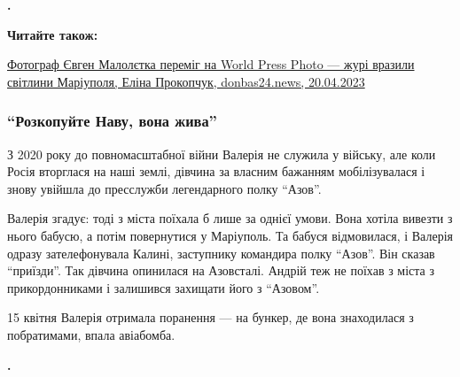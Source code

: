 \begin{leftbar}
	\begingroup
		\bfseries
{}.
	\endgroup
\end{leftbar}


\textbf{Читайте також:} 

\href{https://donbas24.news/news/fotograf-jevgen-maloljetka-peremig-na-world-press-photo-zuri-vrazili-svitlini-mariupolya}{%
Фотограф Євген Малолєтка переміг на World Press Photo — журі вразили світлини Маріуполя, %
Еліна Прокопчук, donbas24.news, 20.04.2023%
}

\subsubsection{\enquote{Розкопуйте Наву, вона жива}}

З 2020 року до повномасштабної війни Валерія не служила у війську, але коли
Росія вторглася на наші землі, дівчина за власним бажанням мобілізувалася і
знову увійшла до пресслужби легендарного полку \enquote{Азов}.

Валерія згадує: тоді з міста поїхала б лише за однієї умови. Вона хотіла
вивезти з нього бабусю, а потім повернутися у Маріуполь. Та бабуся відмовилася,
і Валерія одразу зателефонувала Калині, заступнику командира полку \enquote{Азов}. Він
сказав \enquote{приїзди}. Так дівчина опинилася на Азовсталі. Андрій теж не поїхав з
міста з прикордонниками і залишився захищати його з \enquote{Азовом}.

15 квітня Валерія отримала поранення — на бункер, де вона знаходилася з
побратимами, впала авіабомба.

\begin{leftbar}
	\begingroup
		\bfseries
{}.
	\endgroup
\end{leftbar}

